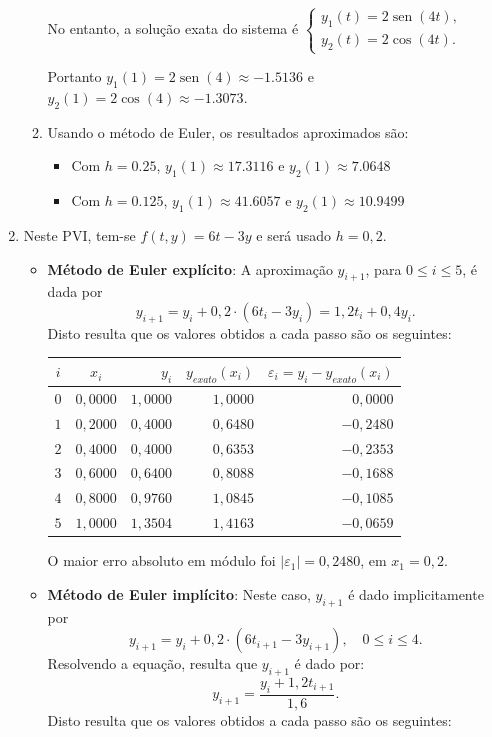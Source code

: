 \documentclass[12pt,a4paper]{article}
\newcommand*\sen{\operatorname{sen}}
\begin{document}
\begin{enumerate}
\begin{enumerate}
No entanto, a solução exata do sistema é
$\begin{cases}
y_1(t) = 2\sen(4t),\\
y_2(t) = 2\cos(4t).
\end{cases}$

Portanto $y_1(1) = 2\sen(4) \approx -1.5136$ e $y_2(1) = 2\cos(4) \approx -1.3073$.
\item Usando o método de Euler, os resultados aproximados são:
\begin{itemize}
\item Com $h=0.25$, $y_1(1) \approx 17.3116$ e $y_2(1) \approx 7.0648$
\item Com $h=0.125$, $y_1(1) \approx 41.6057$ e $y_2(1) \approx 10.9499$
\end{itemize}
\end{enumerate}
\item Neste PVI, tem-se $f(t, y) = 6t - 3y$ e será usado $h = 0,2$.
\begin{itemize}
\item \textbf{Método de Euler explícito}: A aproximação $y_{i + 1}$, para $0 \leq i \leq 5$, é dada por
\[
y_{i + 1}
= y_{i} + 0,2 \cdot \left( 6 t_i - 3y_i \right)
= 1,2 t_i + 0,4 y_{i}.
\]
Disto resulta que os valores obtidos a cada passo são os seguintes:

\medskip
\begin{center}
\begin{tabular}{ccrrr}
\hline
$i$ & $x_i$ & $y_i$ & $y_{exato}(x_i)$ & $\varepsilon_i = y_i-y_{exato}(x_i)$ \\ \hline
$0$ & $0,0000$ & $1,0000$ & $1,0000$ & $ 0,0000$ \\
$1$ & $0,2000$ & $0,4000$ & $0,6480$ & $-0,2480$ \\
$2$ & $0,4000$ & $0,4000$ & $0,6353$ & $-0,2353$ \\
$3$ & $0,6000$ & $0,6400$ & $0,8088$ & $-0,1688$ \\
$4$ & $0,8000$ & $0,9760$ & $1,0845$ & $-0,1085$ \\
$5$ & $1,0000$ & $1,3504$ & $1,4163$ & $-0,0659$ \\
\hline
\end{tabular}
\end{center}
\medskip
O maior erro absoluto em módulo foi $|\varepsilon_1| = 0,2480$, em $x_1 = 0,2$.

\item \textbf{Método de Euler implícito}: Neste caso, $y_{i + 1}$ é dado implicitamente por
\[
y_{i + 1}
= y_{i} + 0,2 \cdot \left( 6 t_{i + 1} - 3y_{i + 1} \right),
\quad 0 \leq i \leq 4.
\]
Resolvendo a equação, resulta que $y_{i + 1}$ é dado por:
\[
y_{i + 1}
= \frac{y_{i} + 1,2 t_{i + 1}}{1,6}.
\]
Disto resulta que os valores obtidos a cada passo são os seguintes:


\end{itemize}
\end{enumerate}
\end{document}
